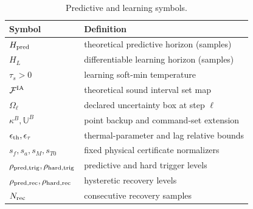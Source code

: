 \begin{table}[t]
\caption{Predictive and learning symbols.}
\label{tab:predictive_symbols}
\centering\scriptsize
\begin{tabular}{ll}
\toprule
Symbol & Definition \\
\midrule
$H_{\rm pred}$ & theoretical predictive horizon (samples) \\
$H_L$ & differentiable learning horizon (samples) \\
$\tau_s>0$ & learning soft-min temperature \\
$\mathcal F^{\rm IA}$ & theoretical sound interval set map \\
$\Omega_\ell$ & declared uncertainty box at step $\ell$ \\
$\kappa^B,\mathbb U^B$ & point backup and command-set extension \\
$\epsilon_{\rm th},\epsilon_\tau$ & thermal-parameter and lag relative bounds \\
$s_f,s_a,s_M,s_{T0}$ & fixed physical certificate normalizers \\
$\rho_{\rm pred,trig},\rho_{\rm hard,trig}$ & predictive and hard trigger levels \\
$\rho_{\rm pred,rec},\rho_{\rm hard,rec}$ & hysteretic recovery levels \\
$N_{\rm rec}$ & consecutive recovery samples \\
\bottomrule
\end{tabular}
\end{table}
